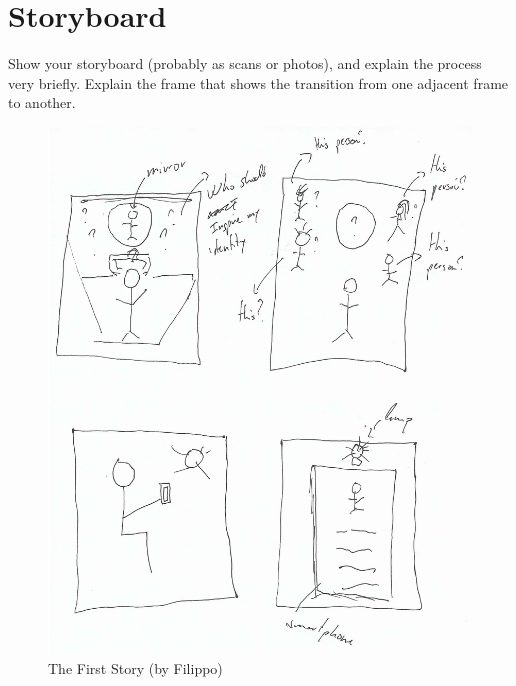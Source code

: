 \documentclass[12pt]{scrartcl}
\begin{document}
	
\section{Storyboard}
	
	Show your storyboard (probably as scans or photos), and explain the process very briefly. Explain the frame that shows the transition from one adjacent frame to another.
	
	\begin{figure}[H]
        		\centering
       		\includegraphics[width=\textwidth]{../images/story1.jpg}
       		\caption{The First Story (by Filippo)}
        		\label{story1}
	\end{figure}
	
\end{document}
